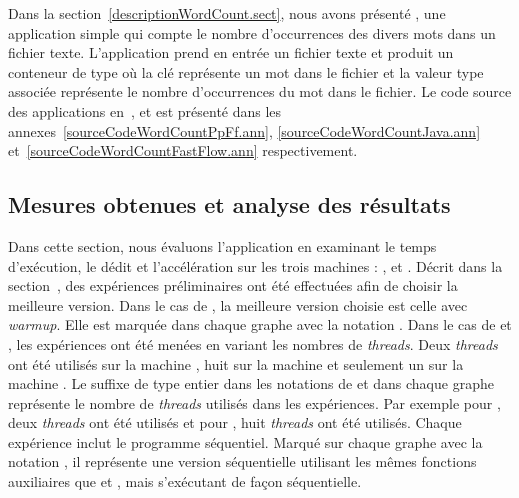 Dans la section~\ref{descriptionWordCount.sect}, nous avons pr\'esent\'e , une application simple qui compte le nombre d'occurrences des divers mots dans un fichier texte. L'application prend en entr\'ee un fichier texte et produit un conteneur de type  où la cl\'e repr\'esente un mot dans le fichier et la valeur  type   associ\'ee repr\'esente le nombre d'occurrences du mot dans le fichier. Le code source des applications  en~,  et  est pr\'esent\'e dans les annexes~\ref{sourceCodeWordCountPpFf.ann}, \ref{sourceCodeWordCountJava.ann} et~\ref{sourceCodeWordCountFastFlow.ann} respectivement.


\subsection{Mesures obtenues et analyse des r\'esultats}








Dans cette section, nous \'evaluons l'application  en examinant le temps d'ex\'ecution, le d\'edit et l'acc\'el\'eration sur les trois machines : ,  et . D\'ecrit dans la section~, des exp\'eriences pr\'eliminaires ont \'et\'e effectu\'ees afin de choisir la meilleure version. Dans le cas de , la meilleure version choisie est celle avec \emph{warmup}. Elle est marqu\'ee dans chaque graphe avec la notation . Dans le cas de  et , les exp\'eriences ont \'et\'e men\'ees en variant les nombres de \emph{threads}. Deux \emph{threads} ont \'et\'e utilis\'es sur la machine , huit sur la machine  et seulement un sur la machine . Le suffixe de type entier dans les notations de  et  dans chaque graphe repr\'esente le nombre de \emph{threads} utilis\'es dans les exp\'eriences. Par exemple pour , deux \emph{threads} ont \'et\'e utilis\'es et pour , huit \emph{threads} ont \'et\'e utilis\'es. Chaque exp\'erience inclut le programme s\'equentiel. Marqu\'e sur chaque graphe avec la notation , il repr\'esente une version s\'equentielle utilisant les m\^emes fonctions auxiliaires que  et , mais s'ex\'ecutant de fa\c con s\'equentielle.

